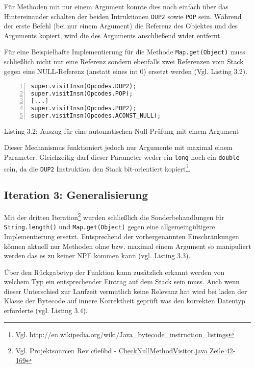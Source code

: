 Für Methoden mit nur einem Argument konnte dies noch einfach über das Hintereinander
schalten der beiden Intruktionen \texttt{DUP2} sowie \texttt{POP} sein.
Während der erste Befehl (bei nur einem Argument) die Referenz des Objektes und des Arguments
kopiert, wird die des Arguments anschließend wider entfernt.

Für eine Beispielhafte Implementierung für die Methode \texttt{Map.get(Object)}
muss schließlich nicht nur eine Referenz sondern ebenfalls zwei Referenzen vom
Stack gegen eine NULL-Referenz (anstatt eines int 0) ersetzt werden (Vgl. Listing 3.2).

\begin{lstlisting}[basicstyle=\ttfamily,numbers=left,numberstyle=\footnotesize\ttfamily,backgroundcolor=\color{source}]
super.visitInsn(Opcodes.DUP2);
super.visitInsn(Opcodes.POP);
[...]
super.visitInsn(Opcodes.POP2);
super.visitInsn(Opcodes.ACONST_NULL);
\end{lstlisting}
\centerline{Listing 3.2: Auszug für eine automatischen Null-Prüfung mit einem Argument}

\vspace{0.3cm}

Dieser Mechanismus funktioniert jedoch nur Argumente mit maximal einem Parameter.
Gleichzeitig darf dieser Parameter weder ein \texttt{long} noch ein \texttt{double} sein,
da die \texttt{DUP2} Instruktion den Stack bit-orientiert kopiert\footnote{Vgl. http://en.wikipedia.org/wiki/Java\_bytecode\_instruction\_listings}.

\subsection{Iteration 3: Generalisierung}

Mit der dritten Iteration\footnote{Vgl. Projektsourcen Rev c6e6bd - \href{https://github.com/jerolimov/java-hardener/blob/c6e6bdc7d081eae5e47d2c926073aa3715d908f6/src/main/java/de/fhkoeln/gm/cui/javahardener/CheckNullMethodVisitor.java\#L42-169}{CheckNullMethodVisitor.java Zeile 42-169}}
wurden schließlich die Sonderbehandlungen für \texttt{String.length()} und
\texttt{Map.get(Object)} gegen eine allgemeingültigere Implementierung ersetzt.
Entsprechend der vorhergenannten Einschränkungen können aktuell nur Methoden ohne
bzw. maximal einem Argument so manipuliert werden das es zu keiner NPE kommen kann
(vgl. Listing 3.3).

Über den Rückgabetyp der Funktion kann zusätzlich erkannt werden von
welchem Typ ein entsprechender Eintrag auf dem Stack sein muss.
Auch wenn dieser Unterschied zur Laufzeit vermutlich keine Relevanz hat
wird bei laden der Klasse der Bytecode auf innere Korrektheit geprüft
was den korrekten Datentyp erforderte (vgl. Listing 3.4).

